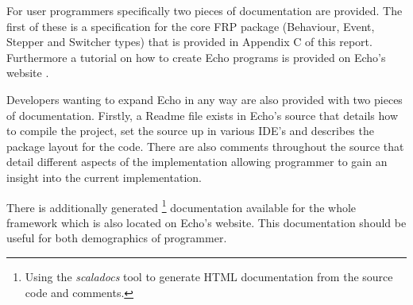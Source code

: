     For user programmers specifically two pieces of documentation
    are provided. The first of these is a specification for the core FRP package (Behaviour, Event, Stepper and Switcher
    types) that is provided in Appendix C of this report. Furthermore a tutorial on how to
    create Echo programs is provided on Echo's website \cite{Stotta}.
    
    Developers wanting to expand Echo in any way are also provided with two pieces of documentation. Firstly, a Readme file 
    exists
    in Echo's source that details how to compile the project, set the source up in various IDE's and describes the package
    layout for the code. There are also comments throughout the source that detail different aspects of the 
    implementation allowing programmer to gain an insight into the current implementation.
    
    There is additionally generated \footnote{Using the \emph{scaladocs} tool to generate HTML documentation
    from the source code and comments.} documentation available for the whole framework which is also located on
    Echo's website. This documentation should be useful for both demographics of programmer.